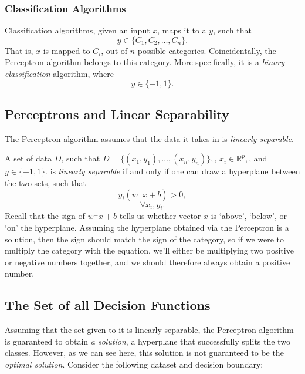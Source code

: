 \subsubsection{Classification Algorithms}
Classification algorithms, given an input $x$, maps it to a $y$, such that
\[
    y \in \{C_1, C_2, \dots, C_n\}.
\]
That is, $x$ is mapped to $C_i$, out of $n$ possible categories.
Coincidentally, the Perceptron algorithm belongs to this category. More specifically, it is a \textit{binary classification} algorithm, where 
\[
    y \in \{-1, 1\}.
\]

\subsection{Perceptrons and Linear Separability}
The Perceptron algorithm assumes that the data it takes in is \textit{linearly separable}.

A set of data $D$, such that
$
    D = \{(x_1,y_1), \dots,(x_n, y_n)\},
$, $
    x_i \in \mathbb{R}^p,
$, and $
    y \in \{-1, 1\}.
$ is \textit{linearly separable} if and only if one can draw a hyperplane between the two sets, such that
\[
    y_i(w^\perp x +b) > 0,
\] \[
    \forall x_i, y_i.
\]
Recall that the sign of $w^\perp x+b$ tells us whether vector $x$ is `above', `below', or `on' the hyperplane. Assuming the hyperplane obtained via the Perceptron is a solution, then the sign should match the sign of the category, so if we were to multiply the category with the equation, we'll either be multiplying two positive or negative numbers together, and we should therefore always obtain a positive number.

\subsection{The Set of all Decision Functions}
Assuming that the set given to it is linearly separable, the Perceptron algorithm is guaranteed to obtain \textit{a solution}, a hyperplane that successfully splits the two classes. However, as we can see here, this solution is not guaranteed to be the \textit{optimal solution}. Consider the following dataset and decision boundary:


